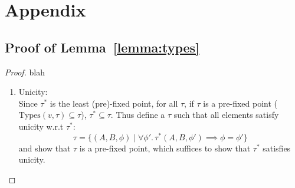 \section{Appendix}

\subsection{Proof of Lemma~\ref{lemma:types}}
\begin{proof}
blah
\begin{enumerate}
\item Unicity:\\
Since $\tau^*$ is the least (pre)-fixed point, for all $\tau$, if $\tau$ is a pre-fixed point 
($\text{Types}(v,\tau) \subseteq \tau$), $\tau^* \subseteq \tau$. Thus define a $\tau$ such that all elements 
satisfy unicity w.r.t $\tau^*$: 
\[\tau = \{(A,B,\phi) \mid \forall \phi'.\, \tau^*(A,B,\phi') \implies \phi = \phi'\}\]
and show that $\tau$ is a pre-fixed point, which suffices to show that $\tau^*$ satisfies unicity.


\end{enumerate}
\end{proof}
